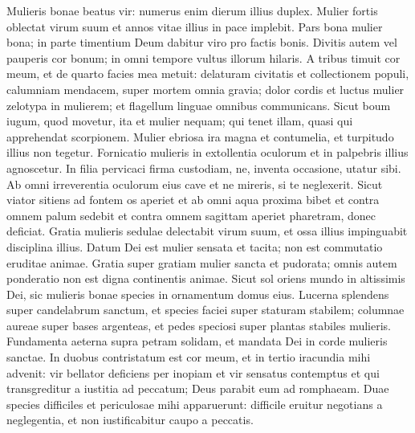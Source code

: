 \begin{biblechapter}  
\verse Mulieris bonae beatus vir: numerus enim dierum illius duplex. 
\verse Mulier fortis oblectat virum suum et annos vitae illius in pace implebit. 
\verse Pars bona mulier bona; in parte timentium Deum dabitur viro pro factis bonis. 
\verse Divitis autem vel pauperis cor bonum; in omni tempore vultus illorum hilaris. 
\verse A tribus timuit cor meum, et de quarto facies mea metuit: 
\verse delaturam civitatis et collectionem populi, 
\verse calumniam mendacem, super mortem omnia gravia; 
\verse dolor cordis et luctus mulier zelotypa in mulierem; 
\verse et flagellum linguae omnibus communicans. 
\verse Sicut boum iugum, quod movetur, ita et mulier nequam; qui tenet illam, quasi qui apprehendat scorpionem. 
\verse Mulier ebriosa ira magna et contumelia, et turpitudo illius non tegetur. 
\verse Fornicatio mulieris in extollentia oculorum et in palpebris illius agnoscetur. 
\verse In filia pervicaci firma custodiam, ne, inventa occasione, utatur sibi. 
\verse Ab omni irreverentia oculorum eius cave et ne mireris, si te neglexerit. 
\verse Sicut viator sitiens ad fontem os aperiet et ab omni aqua proxima bibet et contra omnem palum sedebit et contra omnem sagittam aperiet pharetram, donec deficiat. 
\verse Gratia mulieris sedulae delectabit virum suum, et ossa illius impinguabit 
\verse disciplina illius. Datum Dei est 
\verse mulier sensata et tacita; non est commutatio eruditae animae. 
\verse Gratia super gratiam mulier sancta et pudorata; 
\verse omnis autem ponderatio non est digna continentis animae. 
\verse Sicut sol oriens mundo in altissimis Dei, sic mulieris bonae species in ornamentum domus eius. 
\verse Lucerna splendens super candelabrum sanctum, et species faciei super staturam stabilem; 
\verse columnae aureae super bases argenteas, et pedes speciosi super plantas stabiles mulieris. 
\verse Fundamenta aeterna supra petram solidam, et mandata Dei in corde mulieris sanctae. 
\verse In duobus contristatum est cor meum, et in tertio iracundia mihi advenit: 
\verse vir bellator deficiens per inopiam et vir sensatus contemptus 
\verse et qui transgreditur a iustitia ad peccatum; Deus parabit eum ad romphaeam. 
\verse Duae species difficiles et periculosae mihi apparuerunt: difficile eruitur negotians a neglegentia, et non iustificabitur caupo a peccatis. 
\end{biblechapter}

